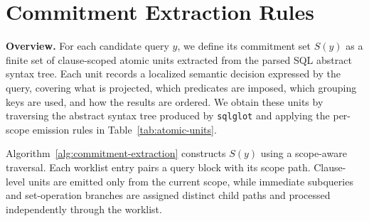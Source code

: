 \section{Commitment Extraction Rules}
\label{app:commitment-extractor}

\noindent\textbf{Overview.}
For each candidate query $y$, we define its commitment set $S(y)$ as a finite set of clause-scoped atomic units extracted from the parsed SQL abstract syntax tree. Each unit records a localized semantic decision expressed by the query, covering what is projected, which predicates are imposed, which grouping keys are used, and how the results are ordered. We obtain these units by traversing the abstract syntax tree produced by \texttt{sqlglot} and applying the per-scope emission rules in Table~\ref{tab:atomic-units}.

Algorithm~\ref{alg:commitment-extraction} constructs $S(y)$ using a scope-aware traversal. Each worklist entry pairs a query block with its scope path. Clause-level units are emitted only from the current scope, while immediate subqueries and set-operation branches are assigned distinct child paths and processed independently through the worklist.

